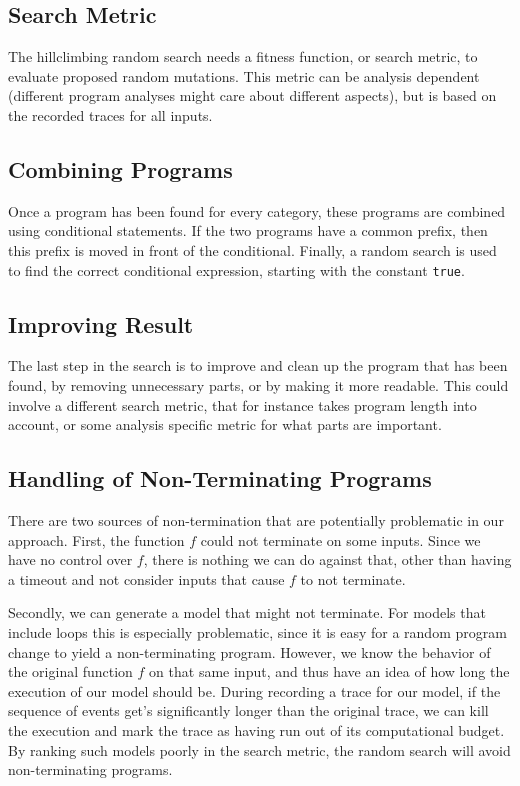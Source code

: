 \documentclass[]{article}
\newcommand{\code}[1]{\lstinline{#1}}
\begin{document}
\subsection{Search Metric}

The hillclimbing random search needs a fitness function, or search metric, to
evaluate proposed random mutations.
This metric can be analysis dependent (different program analyses might care
about different aspects), but is based on the recorded traces for all inputs.



\subsection{Combining Programs}

Once a program has been found for every category, these programs
are combined using conditional statements.  If the two programs
have a common prefix, then this prefix is moved in front of the conditional.
Finally, a random search is used to find the correct conditional
expression, starting with the constant \code{true}.

\subsection{Improving Result}

The last step in the search is to improve and clean up the program
that has been found, by removing unnecessary parts, or by making it
more readable.  This could involve a different search metric, that for instance
takes program length into account, or some analysis specific metric for what
parts are important.

\subsection{Handling of Non-Terminating Programs}

There are two sources of non-termination that are potentially problematic
in our approach.  First, the function $f$ could not terminate on some inputs.
Since we have no control over $f$, there is nothing we can do against that,
other than having a timeout and not consider inputs that cause $f$ to not terminate.

Secondly, we can generate a model that might not terminate.  For models that
include loops this is especially problematic, since it is easy for
a random program change to yield a non-terminating program.  However, we know
the behavior of the original function $f$ on that same input, and thus
have an idea of how long the execution of our model should be.  During
recording a trace for our model, if the sequence of events get's significantly
longer than the original trace, we can kill the execution and mark the
trace as having run out of its computational budget.
By ranking such models poorly in the search metric, the random search will
avoid non-terminating programs.
\end{document}
